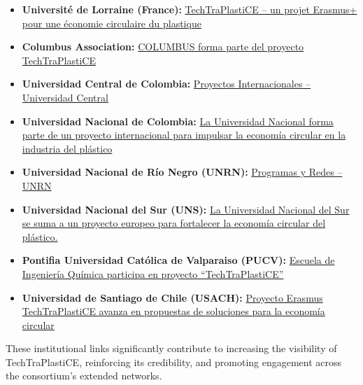 \documentclass[
  12pt,
  oneside]{book}
\providecommand{\tightlist}{%
  \setlength{\itemsep}{0pt}\setlength{\parskip}{0pt}}
\begin{document}
\begin{itemize}
\tightlist
\item
  \textbf{Université de Lorraine (France):}
  \href{https://ensgsi.univ-lorraine.fr/recherche-ensgsi/chaires-partenariales-et-grands-projets-ensgsi/techtraplastice-un-projet-erasmus-pour-une-economie-circulaire-du-plastique/}{TechTraPlastiCE
  -- un projet Erasmus+ pour une économie circulaire du plastique}
\item
  \textbf{Columbus Association:}
  \href{https://columbus-web.org/servicios/}{COLUMBUS forma parte del
  proyecto TechTraPlastiCE}
\item
  \textbf{Universidad Central de Colombia:}
  \href{https://www.ucentral.edu.co/investigacion/proyectos-internacionales}{Proyectos
  Internacionales -- Universidad Central}
\item
  \textbf{Universidad Nacional de Colombia:}
  \href{https://ingenieria.bogota.unal.edu.co/la-universidad-nacional-forma-parte-de-un-proyecto-internacional-para-impulsar-la-economia-circular-en-la-industria-del-plastico/}{La
  Universidad Nacional forma parte de un proyecto internacional para
  impulsar la economía circular en la industria del plástico}
\item
  \textbf{Universidad Nacional de Río Negro (UNRN):}
  \href{https://www.unrn.edu.ar/section/38/programas-y-redes.html}{Programas
  y Redes -- UNRN}
\item
  \textbf{Universidad Nacional del Sur (UNS):}
  \href{https://internacionalizacion.uns.edu.ar/techtraplastice/}{La
  Universidad Nacional del Sur se suma a un proyecto europeo para
  fortalecer la economía circular del plástico.}
\item
  \textbf{Pontifia Universidad Católica de Valparaiso (PUCV):}
  \href{https://www.ingenieria.pucv.cl/escuela-de-ingenieria-quimica-participa-en-proyecto-techtraplastice-para-impulsar-la-economia-circular-en-la-industria-del-plastico/}{Escuela
  de Ingeniería Química participa en proyecto ``TechTraPlastiCE''}
\item
  \textbf{Universidad de Santiago de Chile (USACH):}
  \href{https://www.ingenieriaindustrial-usach.cl/noticias/proyecto-erasmus-techtraplastice-avanza-en-propuestas-de-soluciones-para-la-economia-circular-en-colombia/}{Proyecto
  Erasmus TechTraPlastiCE avanza en propuestas de soluciones para la
  economía circular}
\end{itemize}

These institutional links significantly contribute to increasing the
visibility of TechTraPlastiCE, reinforcing its credibility, and
promoting engagement across the consortium's extended networks.
\end{document}
